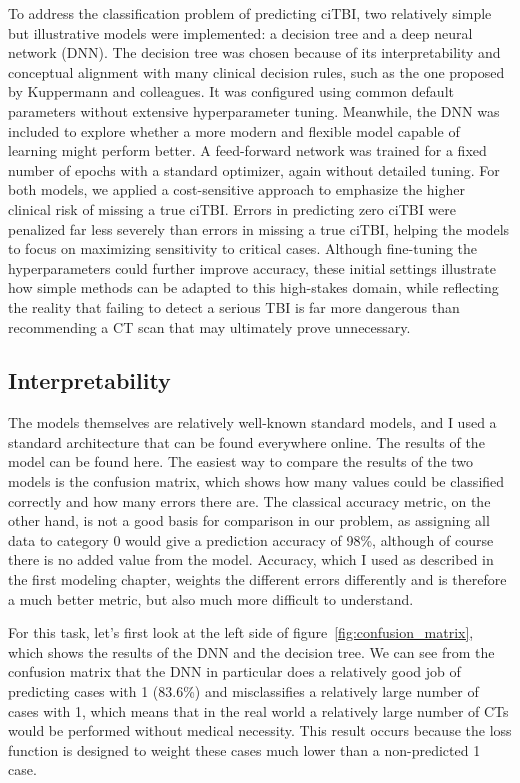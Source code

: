 \documentclass[10pt,letterpaper]{article}
\begin{document}
To address the classification problem of predicting ciTBI, two relatively simple but illustrative models were implemented: a decision tree and a deep neural network (DNN). The decision tree was chosen because of its interpretability and conceptual alignment with many clinical decision rules, such as the one proposed by Kuppermann and colleagues. It was configured using common default parameters without extensive hyperparameter tuning. Meanwhile, the DNN was included to explore whether a more modern and flexible model capable of learning might perform better. A feed-forward network was trained for a fixed number of epochs with a standard optimizer, again without detailed tuning. For both models, we applied a cost-sensitive approach to emphasize the higher clinical risk of missing a true ciTBI. Errors in predicting zero ciTBI were penalized far less severely than errors in missing a true ciTBI, helping the models to focus on maximizing sensitivity to critical cases. Although fine-tuning the hyperparameters could further improve accuracy, these initial settings illustrate how simple methods can be adapted to this high-stakes domain, while reflecting the reality that failing to detect a serious TBI is far more dangerous than recommending a CT scan that may ultimately prove unnecessary.

\subsection{Interpretability}

The models themselves are relatively well-known standard models, and I used a standard architecture that can be found everywhere online. The results of the model can be found here. The easiest way to compare the results of the two models is the confusion matrix, which shows how many values could be classified correctly and how many errors there are. The classical accuracy metric, on the other hand, is not a good basis for comparison in our problem, as assigning all data to category 0 would give a prediction accuracy of 98\%, although of course there is no added value from the model. Accuracy, which I used as described in the first modeling chapter, weights the different errors differently and is therefore a much better metric, but also much more difficult to understand.

For this task, let's first look at the left side of figure~\ref{fig:confusion_matrix}, which shows the results of the DNN and the decision tree. We can see from the confusion matrix that the DNN in particular does a relatively good job of predicting cases with 1 (83.6\%) and misclassifies a relatively large number of cases with 1, which means that in the real world a relatively large number of CTs would be performed without medical necessity. This result occurs because the loss function is designed to weight these cases much lower than a non-predicted 1 case.
\end{document}
